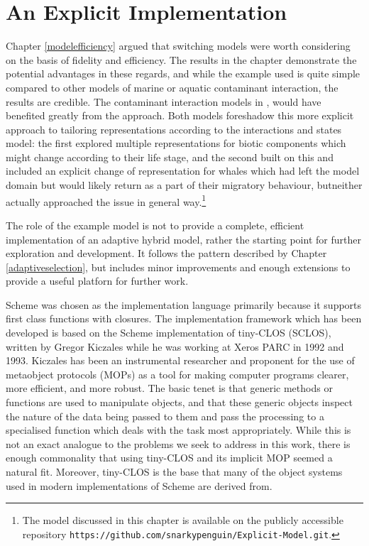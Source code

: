 

\chapter[An Explicit Implementation]{An Explicit Implementation}
\WeAreOn{\cfive}\label{explicitmodel}

Chapter \ref{modelefficiency} argued that switching models were worth
considering on the basis of fidelity and efficiency. The results in
the chapter demonstrate the potential advantages in these regards, and
while the example used is quite simple compared to other models of
marine or aquatic contaminant interaction, the results are credible.
The contaminant interaction models in \cite{Gray2006nws,
  Gray2014}, would have benefited greatly from the approach. Both
models foreshadow this more explicit approach to tailoring
representations according to the interactions and states model: the
first explored multiple representations for biotic components which
might change according to their life stage, and the second built on
this and included an explicit change of representation for whales
which had left the model domain but would likely return as a part of
their migratory behaviour, butneither actually approached the 
issue in general way.\footnote{The model discussed in this chapter is available on the publicly
accessible repository
{\texttt{https://github.com/snarkypenguin/Explicit-Model.git}.}}

The role of the example model is not to provide a complete, efficient
implementation of an adaptive hybrid model, rather the starting point
for further exploration and development.  It follows the pattern
described by Chapter \ref{adaptiveselection}, but includes minor
improvements and enough extensions to provide a useful platforn for
further work.  

Scheme was chosen as the implementation language primarily because it
supports first class functions with closures.  The implementation
framework which has been developed is based on the Scheme
implementation of tiny-CLOS (SCLOS), written by Gregor Kiczales
\cite{kiczales1993xerox} while he was working at Xeros PARC in 1992
and 1993.  Kiczales has been an instrumental researcher and proponent
for the use of metaobject protocols (MOPs) as a tool for making
computer programs clearer, more efficient, and more robust.  The basic
tenet is that generic methods or functions are used to manipulate
objects, and that these generic objects inspect the nature of the data
being passed to them and pass the processing to a specialised function
which deals with the task most appropriately.  While this is not an
exact analogue to the problems we seek to address in this work, there
is enough commonality that using tiny-CLOS and its implicit MOP seemed
a natural fit.  Moreover, tiny-CLOS is the base that many of the
object systems used in modern implementations of Scheme are derived
from.

